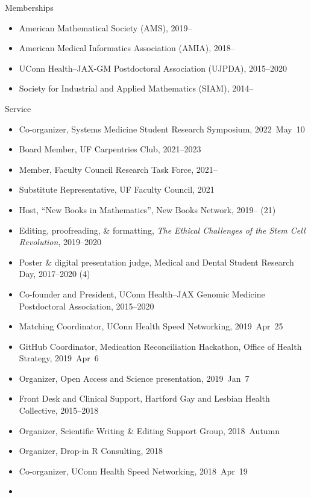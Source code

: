 \documentclass[10pt,a4paper]{article}
\begin{document}
\vspace{.25cm}
{\sc Memberships}
\begin{itemize}[label=$\circ$,nolistsep]
\item
American Mathematical Society (AMS), 2019--
\item
American Medical Informatics Association (AMIA), 2018--
\item
UConn Health--JAX-GM Postdoctoral Association (UJPDA), 2015--2020
\item
Society for Industrial and Applied Mathematics (SIAM), 2014--
\end{itemize}

\vspace{.25cm}
{\sc Service}
\begin{itemize}[label=$\circ$,nolistsep]
\item
Co-organizer, Systems Medicine Student Research Symposium, 2022~May~10
\item
Board Member, UF Carpentries Club, 2021--2023
\item
Member, Faculty Council Research Task Force, 2021--
\item
Substitute Representative, UF Faculty Council, 2021
\item
Host, ``New Books in Mathematics'', New Books Network, 2019-- (21)
\item
Editing, proofreading, \& formatting, {\itshape The Ethical Challenges of the Stem Cell Revolution}, 2019--2020
\item
Poster \& digital presentation judge, Medical and Dental Student Research Day, 2017--2020 (4)
\item
Co-founder and President, UConn Health--JAX Genomic Medicine Postdoctoral Association, 2015--2020
\item
Matching Coordinator, UConn Health Speed Networking, 2019~Apr~25
\item
GitHub Coordinator, Medication Reconciliation Hackathon, Office of Health Strategy, 2019~Apr~6
\item
Organizer, Open Access and Science presentation, 2019~Jan~7
\item
Front Desk and Clinical Support, Hartford Gay and Lesbian Health Collective, 2015--2018
\item
Organizer, Scientific Writing \& Editing Support Group, 2018~Autumn
\item
Organizer, Drop-in R Consulting, 2018
\item
Co-organizer, UConn Health Speed Networking, 2018~Apr~19
\item

\end{itemize}
\end{document}

